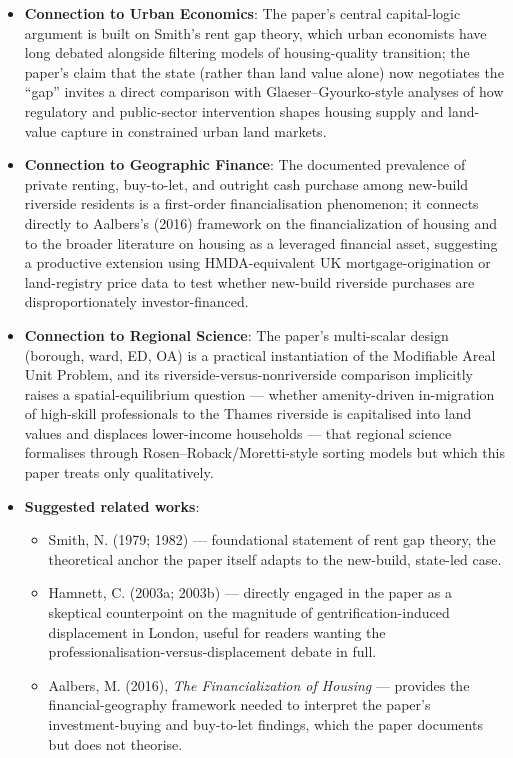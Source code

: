\begin{itemize}
  \item \textbf{Connection to Urban Economics}: The paper's central capital-logic argument is built on Smith's rent gap theory, which urban economists have long debated alongside filtering models of housing-quality transition; the paper's claim that the state (rather than land value alone) now negotiates the ``gap'' invites a direct comparison with Glaeser--Gyourko-style analyses of how regulatory and public-sector intervention shapes housing supply and land-value capture in constrained urban land markets.
  \item \textbf{Connection to Geographic Finance}: The documented prevalence of private renting, buy-to-let, and outright cash purchase among new-build riverside residents is a first-order financialisation phenomenon; it connects directly to Aalbers's (2016) framework on the financialization of housing and to the broader literature on housing as a leveraged financial asset, suggesting a productive extension using HMDA-equivalent UK mortgage-origination or land-registry price data to test whether new-build riverside purchases are disproportionately investor-financed.
  \item \textbf{Connection to Regional Science}: The paper's multi-scalar design (borough, ward, ED, OA) is a practical instantiation of the Modifiable Areal Unit Problem, and its riverside-versus-nonriverside comparison implicitly raises a spatial-equilibrium question --- whether amenity-driven in-migration of high-skill professionals to the Thames riverside is capitalised into land values and displaces lower-income households --- that regional science formalises through Rosen--Roback/Moretti-style sorting models but which this paper treats only qualitatively.
  \item \textbf{Suggested related works}:
    \begin{itemize}
      \item Smith, N. (1979; 1982) --- foundational statement of rent gap theory, the theoretical anchor the paper itself adapts to the new-build, state-led case.
      \item Hamnett, C. (2003a; 2003b) --- directly engaged in the paper as a skeptical counterpoint on the magnitude of gentrification-induced displacement in London, useful for readers wanting the professionalisation-versus-displacement debate in full.
      \item Aalbers, M. (2016), \emph{The Financialization of Housing} --- provides the financial-geography framework needed to interpret the paper's investment-buying and buy-to-let findings, which the paper documents but does not theorise.
    \end{itemize}
\end{itemize}

